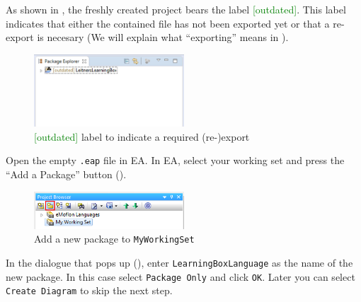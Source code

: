 \begin{stepbystep}
\item
As shown in , the freshly created project bears the label \textcolor{green}{[outdated]}.
This label indicates that either the contained  file has not been exported yet or that a re-export is necesary (We will explain what \enquote{exporting} means in ).
%
\begin{figure}[htbp]
    \centering
    \includegraphics[width=0.5\textwidth]{../../org.moflon.doc.handbook.02_leitnersLearningBox/2_staticSemantics/1_newStart/nsVisImages/eclipse_OutdatedLabel}
    \caption{\textcolor{green}{[outdated]} label to indicate a required (re-)export}
    \label{eclipse:OutdatedLabel}
\end{figure}

\vspace{0.5cm}

\item Open the empty \texttt{.eap} file in EA.
In EA, select your working set and press the ``Add a Package'' button (). 

\begin{figure}[htbp]
	\centering
  \includegraphics[width=0.5\textwidth]{../../org.moflon.doc.handbook.02_leitnersLearningBox/2_staticSemantics/1_newStart/nsVisImages/ea_addPackage}
	\caption{Add a new package to \texttt{MyWorkingSet}}
	\label{ea:newPackage}
	\vspace{0.5cm}
\end{figure}

\clearpage

\item In the dialogue that pops up (), enter \texttt{LearningBoxLanguage} as the name of the new
package. In this case select \texttt{Package Only} and click \texttt{OK}. Later you can select \texttt{Create Diagram} to skip the next step.

\vspace{0.5cm}


\end{stepbystep}
